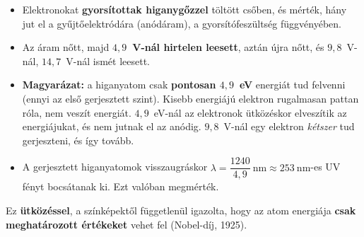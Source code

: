 \documentclass[12pt]{article}
\begin{document}
\begin{minipage}[t]{0.52\linewidth}\vspace{0pt}
\begin{itemize}
  \item Elektronokat \textbf{gyorsítottak higanygőzzel} töltött csőben, és mérték, hány jut
    el a gyűjtőelektródára (anódáram), a gyorsítófeszültség függvényében.
  \item Az áram nőtt, majd \textbf{$4{,}9$~V-nál hirtelen leesett}, aztán újra nőtt, és
    $9{,}8$~V-nál, $14{,}7$~V-nál ismét leesett.
  \item \textbf{Magyarázat:} a higanyatom csak \textbf{pontosan $4{,}9$~eV} energiát tud
    felvenni (ennyi az első gerjesztett szint). Kisebb energiájú elektron rugalmasan
    pattan róla, nem veszít energiát. $4{,}9$~eV-nál az elektronok ütközéskor elveszítik
    az energiájukat, és nem jutnak el az anódig. $9{,}8$~V-nál egy elektron
    \emph{kétszer} tud gerjeszteni, és így tovább.
  \item A gerjesztett higanyatomok visszaugráskor
    $\lambda = \dfrac{1240}{4{,}9}~\text{nm} \approx 253~\text{nm}$-es UV fényt bocsátanak
    ki. Ezt valóban megmérték.
\end{itemize}
\begin{fontos}
Ez \textbf{ütközéssel}, a színképektől függetlenül igazolta, hogy az atom energiája
\textbf{csak meghatározott értékeket} vehet fel (Nobel-díj, 1925).
\end{fontos}
\end{minipage}\hfill
\begin{minipage}[t]{0.45\linewidth}\vspace{0pt}\centering
{}
\end{minipage}
\end{document}
